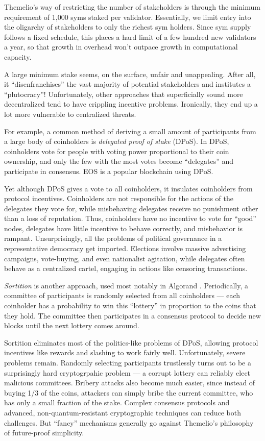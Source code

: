 \documentclass[headinclude,12pt]{scrbook}
\begin{document}
Themelio's way of restricting the number of stakeholders is through the
minimum requirement of 1,000 syms staked per validator. Essentially, we
limit entry into the oligarchy of stakeholders to only the richest sym
holders. Since sym supply follows a fixed schedule, this places a hard
limit of a few hundred new validators a year, so that growth in overhead
won't outpace growth in computational capacity.

A large minimum stake seems, on the surface, unfair and unappealing.
After all, it ``disenfranchises'' the vast majority of potential
stakeholders and institutes a ``plutocracy''! Unfortunately, other
approaches that superficially sound more decentralized tend to have
crippling incentive problems. Ironically, they end up a lot more
vulnerable to centralized threats.

For example, a common method of deriving a small amount of participants
from a large body of coinholders is \emph{delegated proof of stake}
(DPoS). In DPoS, coinholders vote for people with voting power
proportional to their coin ownership, and only the few with the most
votes become ``delegates'' and participate in consensus. EOS is a
popular blockchain using DPoS.

Yet although DPoS gives a vote to all coinholders, it insulates
coinholders from protocol incentives. Coinholders are not responsible
for the actions of the delegates they vote for, while misbehaving
delegates receive no punishment other than a loss of reputation. Thus,
coinholders have no incentive to vote for ``good'' nodes, delegates have
little incentive to behave correctly, and misbehavior is rampant.
Unsurprisingly, all the problems of political governance in a
representative democracy get imported. Elections involve massive
advertising campaigns, vote-buying, and even nationalist agitation\cite{zhihu2019votebuy}, while delegates often behave as a centralized
cartel, engaging in actions like censoring transactions\cite{eoscensor}.

\emph{Sortition} is another approach, used most notably in Algorand
\cite{gilad2017algorand}. Periodically, a committee of participants is
randomly selected from all coinholders --- each coinholder has a
probability to win this ``lottery'' in proportion to the coins that they
hold. The committee then participates in a consensus protocol to decide
new blocks until the next lottery comes around.

Sortition eliminates most of the politics-like problems of DPoS,
allowing protocol incentives like rewards and slashing to work fairly
well. Unfortunately, severe problems remain. Randomly selecting
participants trustlessly turns out to be a surprisingly hard
cryptogrpahic problem --- a corrupt lottery can reliably elect malicious
committees. Bribery attacks also become much easier, since instead of
buying 1/3 of the coins, attackers can simply bribe the current
committee, who has only a small fraction of the stake. Complex consensus
protocols and advanced, non-quantum-resistant cryptographic techniques
can reduce both challenges. But ``fancy'' mechanisms generally go
against Themelio's philosophy of future-proof simplicity.
\end{document}
